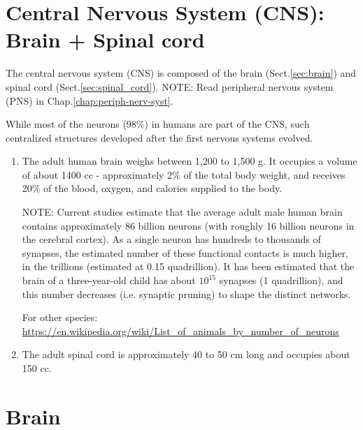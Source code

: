 \chapter{Central Nervous System (CNS): Brain + Spinal cord}
\label{chap:CNS}
\label{chap:brain}

The central nervous system (CNS) is composed of the brain (Sect.\ref{sec:brain})
and spinal cord (Sect.\ref{sec:spinal_cord}). NOTE: Read peripheral nervous
system (PNS) in Chap.\ref{chap:periph-nerv-syst}.

While most of the neurons (98\%) in humans are part of the CNS, such centralized
structures developed after the first nervous systems evolved.
\begin{enumerate}
  
  \item  The adult human brain weighs between 1,200 to 1,500 g. It occupies a
  volume of about 1400 cc - approximately 2\% of the total body weight, and
  receives 20\% of the blood, oxygen, and calories supplied to the body.

NOTE:  Current studies estimate that the average adult male human brain contains
approximately 86 billion neurons (with  roughly 16 billion neurons in the
cerebral cortex).  As a single neuron has hundreds to thousands of synapses, the
estimated number of these functional contacts is much higher, in the trillions
(estimated at 0.15 quadrillion).
It has been estimated that the brain of a three-year-old child has about
$10^{15}$ synapses (1 quadrillion), and this number decreases (i.e.
synaptic pruning) to shape the distinct networks.

For other species:
\url{https://en.wikipedia.org/wiki/List_of_animals_by_number_of_neurons}


  \item The adult spinal cord is approximately 40 to 50 cm long and occupies
  about 150 cc.
\end{enumerate}



\chapter{Brain}

